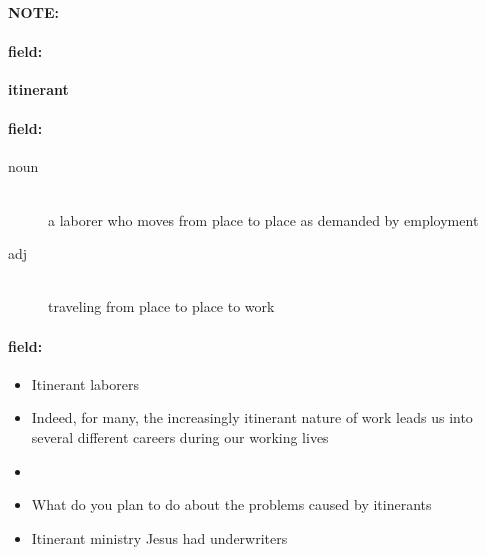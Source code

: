 \documentclass[12pt]{article}
\newenvironment{note}{\paragraph{NOTE:}}{}
\newenvironment{field}{\paragraph{field:}}{}
\begin{document}
\begin{note}
\begin{field}
\textbf{\large itinerant}
\end{field}


\begin{field}
\begin{description}
\item[noun] \hfill \\ 
a laborer who moves from place to place as demanded by employment

\item[adj] \hfill \\ 
traveling from place to place to work

\end{description}
\end{field}

\begin{field}
\begin{itemize}
\item Itinerant laborers
\item Indeed, for many, the increasingly itinerant nature of work leads us into several different careers during our working lives
\item 
\item What do you plan to do about the problems caused by itinerants
\item Itinerant ministry Jesus had underwriters
\end{itemize}
\end{field}
\end{note}
\end{document}
